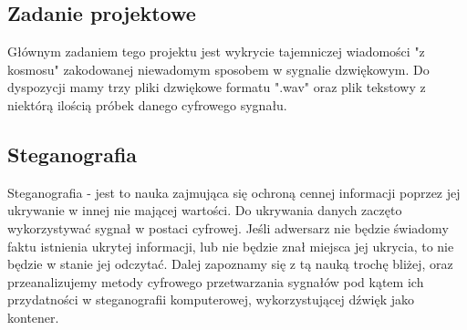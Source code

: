\documentclass[a4paper,titleauthor]{mwart}
\begin{document}
	\subsection{Zadanie projektowe}
	
	Głównym zadaniem tego projektu jest wykrycie tajemniczej wiadomości "z kosmosu" zakodowanej niewadomym sposobem w sygnalie dzwiękowym. Do dyspozycji mamy trzy pliki dzwiękowe formatu ".wav" oraz plik tekstowy z niektórą ilością próbek danego cyfrowego sygnału. \newline  \newline 
	
	\subsection{Steganografia}
	
	Steganografia - jest to nauka zajmująca się ochroną cennej informacji poprzez jej ukrywanie w innej nie mającej wartości. Do ukrywania danych zaczęto wykorzystywać sygnał w postaci cyfrowej. \newline Jeśli adwersarz nie będzie świadomy faktu istnienia ukrytej informacji, lub nie będzie znał miejsca jej ukrycia, to nie będzie w stanie jej odczytać. \newline \newline 
	Dalej zapoznamy się z tą nauką trochę bliżej, oraz przeanalizujemy metody cyfrowego przetwarzania sygnałów pod kątem ich przydatności w steganografii komputerowej, wykorzystującej dźwięk jako kontener.
	
\end{document}
